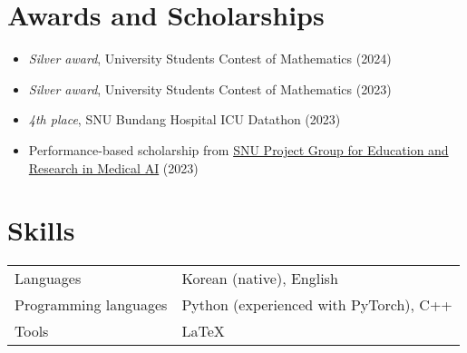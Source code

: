 \documentclass[10pt, a4paper]{article}
\newenvironment{customitemize}
	{\begin{itemize}[leftmargin=*, noitemsep, topsep=0pt, label=$\cdot$]}
	{\end{itemize}}
\begin{document}
\section*{Awards and Scholarships}
\begin{customitemize}
    \item \textit{Silver award}, University Students Contest of Mathematics (2024)
    \item \textit{Silver award}, University Students Contest of Mathematics (2023)
    \item \textit{4th place}, SNU Bundang Hospital ICU Datathon (2023)
    \item Performance-based scholarship from \href{http://snuaimed.org/}{SNU Project Group for Education and Research in Medical AI} (2023)
\end{customitemize}

\section*{Skills}
\begin{tabular}{@{}ll@{}}
    Languages & Korean (native), English \\
    Programming languages & Python (experienced with PyTorch), C++ \\
    Tools & \LaTeX
\end{tabular}
\end{document}
